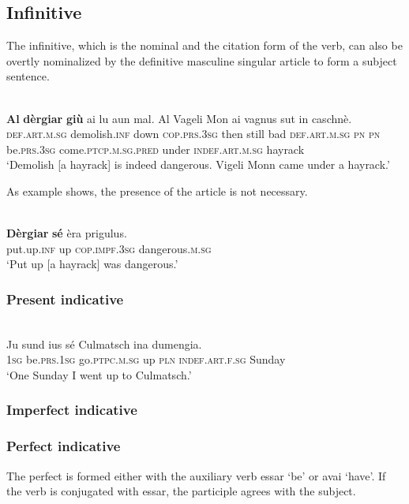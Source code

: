 \subsection{Infinitive}

The infinitive, which is the nominal and the citation form of the verb, can also be overtly nominalized by the definitive masculine singular article to form a subject sentence.
 
\ea\label{}
\\
\gll \textbf{Al} \textbf{dèrgiar} \textbf{giù} ai lu aun mal. Al Vageli Mon ai vagnus sut in caschnè.\\
  \textsc{def.art.m.sg} demolish.\textsc{inf} down \textsc{cop.prs.3sg} then still bad \textsc{def.art.m.sg} \textsc{pn} \textsc{pn} be.\textsc{prs.3sg} come.\textsc{ptcp.m.sg.pred} under \textsc{indef.art.m.sg} hayrack\\
\glt `Demolish [a hayrack] is indeed dangerous. Vigeli Monn came under a hayrack.'
\z

As example shows, the presence of the article is not necessary.

\ea\label{}
\\
\gll \textbf{Dèrgiar} \textbf{sé} èra prigulus.\\
    put.up.\textsc{inf} up \textsc{cop.impf.3sg} dangerous.\textsc{m.sg}\\
\glt `Put up [a hayrack] was dangerous.'
\z


\subsubsection{Present indicative}

\ea\label{}
\\
\gll    Ju sund ius sé Culmatsch ina dumengia. \\
\textsc{1sg} be.\textsc{prs.1sg} go.\textsc{ptpc.m.sg} up \textsc{pln} \textsc{indef.art.f.sg} Sunday\\
     \glt `One Sunday I went up to Culmatsch.'
\z


\subsubsection{Imperfect indicative}


\subsubsection{Perfect indicative}
The perfect is formed either with the auxiliary verb essar `be' or avai `have'. If the verb is conjugated with essar, the participle agrees with the subject.




